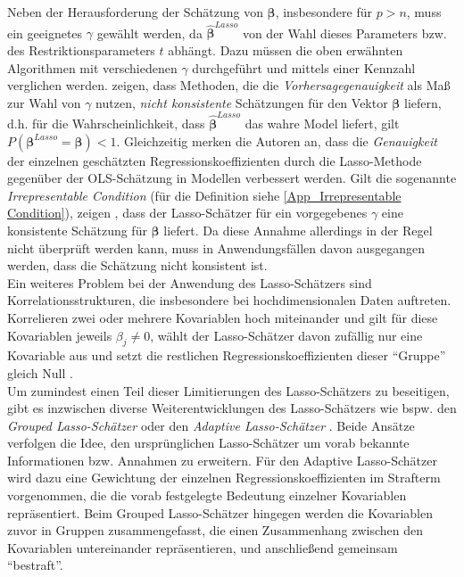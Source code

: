 \documentclass[12pt, a4paper]{report}\usepackage[]{graphicx}\usepackage[]{color}
\begin{document}
Neben der Herausforderung der Schätzung von $\boldsymbol{\beta}$, insbesondere für $p > n$, muss ein geeignetes $\gamma$ gewählt werden, da $\boldsymbol{\hat{\beta}}^{Lasso}$ von der Wahl dieses Parameters bzw. des Restriktionsparameters $t$ abhängt. Dazu müssen die oben erwähnten Algorithmen mit verschiedenen $\gamma$ durchgeführt und mittels einer Kennzahl verglichen werden.  zeigen, dass Methoden, die die \textit{Vorhersagegenauigkeit} als Maß zur Wahl von $\gamma$ nutzen, \textit{nicht konsistente} Schätzungen für den Vektor $\boldsymbol{\beta}$ liefern, d.h. für die Wahrscheinlichkeit, dass $\boldsymbol{\hat{\beta}}^{Lasso}$ das wahre Model liefert, gilt $P(\boldsymbol{\beta}^{Lasso} = \boldsymbol{\beta}) < 1$. Gleichzeitig merken die Autoren an, dass die \textit{Genauigkeit} der einzelnen geschätzten Regressionskoeffizienten durch die Lasso-Methode gegenüber der OLS-Schätzung in Modellen verbessert werden. Gilt die sogenannte \textit{Irrepresentable Condition} (für die Definition siehe \ref{App_Irrepresentable Condition}), zeigen , dass der Lasso-Schätzer für ein vorgegebenes $\gamma$ eine konsistente Schätzung für $\boldsymbol{\beta}$ liefert. Da diese Annahme allerdings in der Regel nicht überprüft werden kann, muss in Anwendungsfällen davon ausgegangen werden, dass die Schätzung nicht konsistent ist.\\
Ein weiteres Problem bei der Anwendung des Lasso-Schätzers sind Korrelationsstrukturen, die insbesondere bei hochdimensionalen Daten auftreten. Korrelieren zwei oder mehrere Kovariablen hoch miteinander und gilt für diese Kovariablen jeweils $\beta_j \neq 0$, wählt der Lasso-Schätzer davon zufällig nur eine Kovariable aus und setzt die restlichen Regressionskoeffizienten dieser "`Gruppe"' gleich Null \cite{Bondell2008OSCAR}.\\
Um zumindest einen Teil dieser Limitierungen des Lasso-Schätzers zu beseitigen, gibt es inzwischen diverse Weiterentwicklungen des Lasso-Schätzers wie bspw. den \textit{Grouped Lasso-Schätzer} \cite{Yuan06Grouped_modelselection} oder den \textit{Adaptive Lasso-Schätzer} \cite{zou2006Adaptive_Lasso_oracle_prop}. Beide Ansätze verfolgen die Idee, den ursprünglichen Lasso-Schätzer um vorab bekannte Informationen bzw. Annahmen zu erweitern. Für den Adaptive Lasso-Schätzer wird dazu eine Gewichtung der einzelnen Regressionskoeffizienten im Strafterm vorgenommen, die die vorab festgelegte Bedeutung einzelner Kovariablen repräsentiert. Beim Grouped Lasso-Schätzer hingegen werden die Kovariablen zuvor in Gruppen zusammengefasst, die einen Zusammenhang zwischen den Kovariablen untereinander repräsentieren, und anschließend gemeinsam "`bestraft"'. 
\end{document}
